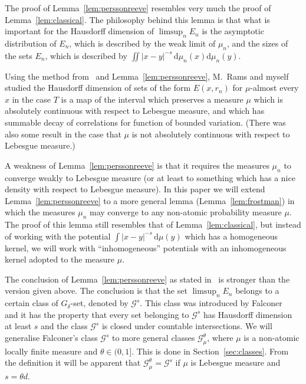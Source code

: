 \documentclass[AHL,Unicode,longabstracts]{cedram}
\newcommand*{\dd}{\mathrm{d}}
\begin{document}
The proof of Lemma~\ref{lem:perssonreeve} resembles very much the proof of Lemma~\ref{lem:classical}. The philosophy behind this lemma is that what is important for the Hausdorff dimension of $\limsup_n E_n$ is the asymptotic distribution of $E_n$, which is described by the weak limit of $\mu_n$, and the sizes of the sets $E_n$, which is described by $\iint |x-y|^{-s} \, \dd\mu_n (x) \dd\mu_n (y)$.

Using the method from~\cite{persson} and Lemma~\ref{lem:perssonreeve}, M.~Rams and myself studied the Hausdorff dimension of sets of the form $E(x,r_n)$ for $\mu$-almost every $x$ in the case $T$ is a map of the interval which preserves a measure $\mu$ which is absolutely continuous with respect to Lebesgue measure, and which has summable decay of correlations for function of bounded variation. (There was also some result in the case that $\mu$ is not absolutely continuous with respect to Lebesgue measure.)

A weakness of Lemma~\ref{lem:perssonreeve} is that it requires the measures $\mu_n$ to converge weakly to Lebesgue measure (or at least to something which has a nice density with respect to Lebesgue measure). In this paper we will extend Lemma~\ref{lem:perssonreeve} to a more general lemma (Lemma~\ref{lem:frostman}) in which the measures $\mu_n$ may converge to any non-atomic probability measure $\mu$. The proof of this lemma still resembles that of Lemma~\ref{lem:classical}, but instead of working with the potential $\int |x-y|^{-s} \,
\dd\mu (y)$ which has a homogeneous kernel, we will work with ``inhomogeneous'' potentials with an inhomogeneous kernel adopted to the measure $\mu$.

The conclusion of Lemma~\ref{lem:perssonreeve} as stated in~\cite{perssonreeve} is stronger than the version given above. The conclusion is that the set $\limsup_n E_n$ belongs to a certain class of $G_\delta$-set, denoted by $\mathscr{G}^s$. This class was introduced by Falconer~\cite{falconer1, falconer2} and it has the property that every set belonging to $\mathscr{G}^s$ has Hausdorff dimension at least $s$ and the class $\mathscr{G}^s$ is closed under countable intersections. We will generalise Falconer's class $\mathscr{G}^s$ to more general classes $\mathscr{G}_\mu^\theta$, where $\mu$ is a non-atomic locally finite measure and $\theta \in (0,1]$. This is done in Section~\ref{sec:classes}. From the definition it will be apparent that $\mathscr{G}_\mu^\theta =
\mathscr{G}^s$ if $\mu$ is Lebesgue measure and $s = \theta d$.
\end{document}
